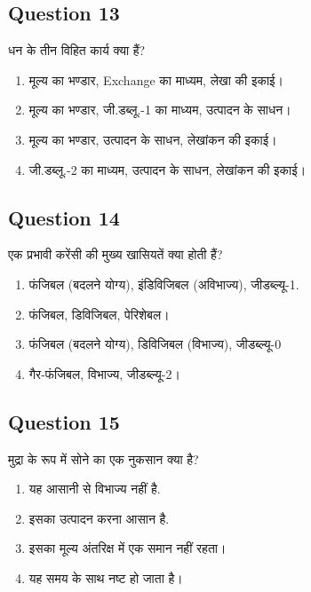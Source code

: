 \documentclass[12pt,a4paper]{article}
\begin{document}
\bigskip


\subsection*{Question 13}
धन के तीन विहित कार्य क्या हैं?

\begin{enumerate}[label=\Alph*., leftmargin=*]
\item मूल्य का भण्डार, Exchange का माध्यम, लेखा की इकाई।
\item मूल्य का भण्डार, जी.डब्लू.-1 का माध्यम, उत्पादन के साधन।
\item मूल्य का भण्डार, उत्पादन के साधन, लेखांकन की इकाई।
\item जी.डब्लू.-2 का माध्यम, उत्पादन के साधन, लेखांकन की इकाई।
\end{enumerate}

\bigskip


\subsection*{Question 14}
एक प्रभावी करेंसी की मुख्य खासियतें क्या होती हैं?

\begin{enumerate}[label=\Alph*., leftmargin=*]
\item फंजिबल (बदलने योग्य), इंडिविजिबल (अविभाज्य), जीडब्ल्यू-1.
\item फंजिबल, डिविजिबल, पेरिशेबल।
\item फंजिबल (बदलने योग्य), डिविजिबल (विभाज्य), जीडब्ल्यू-0
\item गैर-फंजिबल, विभाज्य, जीडब्ल्यू-2।
\end{enumerate}

\bigskip


\subsection*{Question 15}
मुद्रा के रूप में सोने का एक नुकसान क्या है?

\begin{enumerate}[label=\Alph*., leftmargin=*]
\item यह आसानी से विभाज्य नहीं है.
\item इसका उत्पादन करना आसान है.
\item इसका मूल्य अंतरिक्ष में एक समान नहीं रहता।
\item यह समय के साथ नष्ट हो जाता है।
\end{enumerate}

\bigskip
\end{document}
